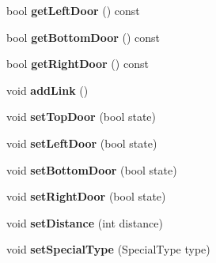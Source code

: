 \begin{DoxyCompactItemize}
\item 
\hypertarget{class_room_a3b86ce135752e252c7f2900f29abbb6f}{bool {\bfseries get\-Left\-Door} () const }\label{class_room_a3b86ce135752e252c7f2900f29abbb6f}

\item 
\hypertarget{class_room_acb8b99c54a262c532a2b4f388fafc36a}{bool {\bfseries get\-Bottom\-Door} () const }\label{class_room_acb8b99c54a262c532a2b4f388fafc36a}

\item 
\hypertarget{class_room_a257c82e3ac31634b8612c33900fc28bc}{bool {\bfseries get\-Right\-Door} () const }\label{class_room_a257c82e3ac31634b8612c33900fc28bc}

\item 
\hypertarget{class_room_ab9ce2180afaa86a1881a245d1b539e03}{void {\bfseries add\-Link} ()}\label{class_room_ab9ce2180afaa86a1881a245d1b539e03}

\item 
\hypertarget{class_room_a6918ec80b6c291bbce3a9f8d8889222f}{void {\bfseries set\-Top\-Door} (bool state)}\label{class_room_a6918ec80b6c291bbce3a9f8d8889222f}

\item 
\hypertarget{class_room_afe6694b78ba1754048dcba4e6036c9a5}{void {\bfseries set\-Left\-Door} (bool state)}\label{class_room_afe6694b78ba1754048dcba4e6036c9a5}

\item 
\hypertarget{class_room_a6bd75cbe373514583b67b6131e484814}{void {\bfseries set\-Bottom\-Door} (bool state)}\label{class_room_a6bd75cbe373514583b67b6131e484814}

\item 
\hypertarget{class_room_a5ba5a9b9807f26d2ea17c8b9377214af}{void {\bfseries set\-Right\-Door} (bool state)}\label{class_room_a5ba5a9b9807f26d2ea17c8b9377214af}

\item 
\hypertarget{class_room_a8515625370a9aec953f76efded718e4b}{void {\bfseries set\-Distance} (int distance)}\label{class_room_a8515625370a9aec953f76efded718e4b}

\item 
\hypertarget{class_room_a5c58b28fceef732f7cf3f865209ab847}{void {\bfseries set\-Special\-Type} (Special\-Type type)}\label{class_room_a5c58b28fceef732f7cf3f865209ab847}

\end{DoxyCompactItemize}


